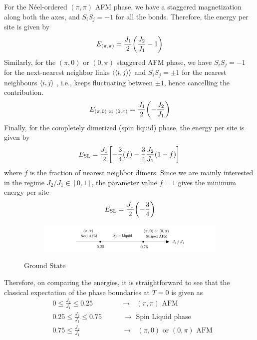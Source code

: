 \documentclass[../thesis_main.tex]{subfiles}
\begin{document}
For the Néel-ordered $(\pi, \pi)$ AFM phase, we have a staggered magnetization along both the axes, and $S_i S_j = - 1$ for all the bonds. Therefore, the energy per site is given by
\begin{equation}
    E_{(\pi, \pi)} = \frac{J_1}{2} \qty(\frac{J_2}{J_1} - 1)
\end{equation}
Similarly, for the $(\pi, 0)$ or $(0, \pi)$ staggered AFM phase, we have $S_i S_j = -1$ for the next-nearest neighbor links $\expval{\expval{i, j}}$ and $S_i S_j = \pm 1$ for the nearest neighbours $\expval{i, j}$ , i.e., keeps fluctuating between $\pm 1$, hence cancelling the contribution.
\begin{equation}
    E_{(\pi, 0) \text{ or } (0, \pi)} = \frac{J_1}{2}\qty(-\frac{J_2}{J_1})
\end{equation} 
Finally, for the completely dimerized (spin liquid) phase, the energy per site is given by
\begin{equation*}
    E_{\text{SL}} = \frac{J_1}{2} \qty[-\frac{3}{4}(f) - \frac{3}{4}\frac{J_2}{J_1}(1-f)]
\end{equation*}
where $f$ is the fraction of nearest neighbor dimers. Since we are mainly interested in the regime $J_2/J_1 \in [0, 1]$, the parameter value $f = 1$ gives the minimum energy per site
\begin{equation}
    E_{\text{SL}} = \frac{J_1}{2} \qty(-\frac{3}{4})
\end{equation}
\begin{figure}[t!]
    \centering
    \begin{subfigure}[b]{1.0\textwidth}  %
        \begin{center}
            \includegraphics[width=\textwidth]{images/j1-j2/classical-expectation.pdf}
        \end{center}
    \end{subfigure}
    \caption{Ground State}
    \label{}
\end{figure}
\!\!\!\!
Therefore, on comparing the energies, it is straightforward to see that the classical expectation of the phase boundaries at $T = 0$ is given as
\begin{align*}
    &0 \leq \frac{J_2}{J_1} \leq 0.25 \qquad \qquad \longrightarrow \text{ $(\pi, \pi)$ AFM} \\
    &0.25 \leq \frac{J_2}{J_1} \leq 0.75 \quad\qquad \longrightarrow \text{ Spin Liquid phase} \\
    &0.75 \leq \frac{J_2}{J_1} \qquad \qquad \qquad \longrightarrow \text{ $(\pi, 0)$ or $(0, \pi)$  AFM}
\end{align*}
\end{document}
